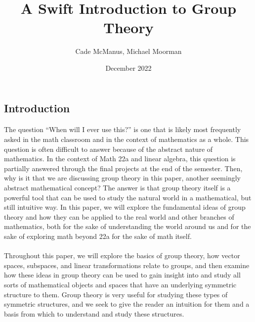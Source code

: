 \documentclass[twoside]{article}
\title{\textbf{A Swift Introduction to Group Theory}}
\author{Cade McManus, Michael Moorman}
\date{December 2022}
\begin{document}
\pagestyle{fancy}
\fancyhf{}
\renewcommand{\headrulewidth}{.7pt}
\fancyfoot[C]{\thepage\ }

\begin{spacing}{1.25}    

\maketitle

\section{Introduction}


\paragraph*{} The question ``When will I ever use this?'' is one that is likely 
most frequently asked in the math classroom and in the context of mathematics 
as a whole. This question is often difficult to answer because 
of the abstract nature of mathematics. In the context of Math 22a and linear 
algebra, this question is partially answered through the final projects 
at the end of the semester. Then, why is it that we are discussing group theory 
in this paper,
another seemingly abstract mathematical concept? The answer is that group theory
itself is a powerful tool that can be used to study the natural world in a 
mathematical, but still intuitive way. In this paper, we will explore the
fundamental ideas of group theory and how they can be applied to the real world
and other branches of mathematics,
both for the sake of understanding the world around us and for the sake of
exploring math beyond 22a for the sake of math itself. 

\paragraph*{} Throughout this paper, we will explore the basics of group theory,
how vector spaces, subspaces, and linear transformations relate to groups, and 
then examine how these ideas in group theory can be used to gain insight into 
and study all sorts of mathematical objects and spaces that have an underlying
symmetric structure to them. Group theory is very useful for studying 
these types of symmetric structures, and we seek to give the reader an intuition
for them and a basis from which to understand and study these structures. 


\end{spacing}
\end{document}
